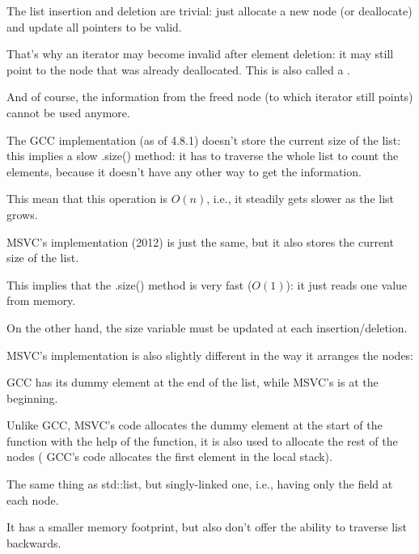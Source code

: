 The list insertion and deletion are trivial: just allocate a new node (or deallocate) and update all pointers
to be valid.

That's why an iterator may become invalid after element deletion: 
it may still point to the node that was already deallocated.
This is also called a .

And of course, the information from the freed node (to which iterator still points) 
cannot be used anymore.

The GCC implementation (as of 4.8.1) doesn't store the current size of the list: this implies a slow .size() method:
it has to traverse the whole list to count the elements, because it doesn't have any other way to get the information.

This mean that this operation is $O(n)$, i.e., it steadily gets slower as the list grows.





\label{MSVC_std_list}

MSVC's implementation (2012) is just the same, but it also stores the current size of the list.

This implies that the .size() method is very fast ($O(1)$): it just reads one value from memory.

On the other hand, the size variable must be updated at each insertion/deletion.

MSVC's implementation is also slightly different in the way it arranges the nodes:



GCC has its dummy element at the end of the list, while MSVC's is at the beginning.



Unlike GCC, MSVC's code allocates the dummy element at the start of the function with the help of the  function,
it is also used to allocate the rest of the nodes (
GCC's code allocates the first element in the local stack).




The same thing as std::list, but singly-linked one, i.e., having only the  field at each node.

It has a smaller memory footprint, but also don't offer the ability to traverse list backwards.

